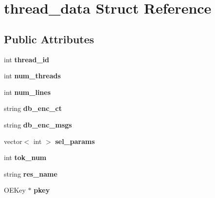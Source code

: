 \hypertarget{structthread__data}{\section{thread\-\_\-data Struct Reference}
\label{structthread__data}
}
\subsection*{Public Attributes}
\begin{DoxyCompactItemize}
\item 
\hypertarget{structthread__data_a7f99c8728f153827a108b77f60420074}{int {\bfseries thread\-\_\-id}}\label{structthread__data_a7f99c8728f153827a108b77f60420074}

\item 
\hypertarget{structthread__data_ac406249a3baf00e1ff1948e3384e4fd9}{int {\bfseries num\-\_\-threads}}\label{structthread__data_ac406249a3baf00e1ff1948e3384e4fd9}

\item 
\hypertarget{structthread__data_a37189156dac628a7eeb2d407e9e76eb4}{int {\bfseries num\-\_\-lines}}\label{structthread__data_a37189156dac628a7eeb2d407e9e76eb4}

\item 
\hypertarget{structthread__data_ac1995c6d9ca873a4678fda316dbce74b}{string {\bfseries db\-\_\-enc\-\_\-ct}}\label{structthread__data_ac1995c6d9ca873a4678fda316dbce74b}

\item 
\hypertarget{structthread__data_aeaf49d487ee0d162a590072089e7c413}{string {\bfseries db\-\_\-enc\-\_\-msgs}}\label{structthread__data_aeaf49d487ee0d162a590072089e7c413}

\item 
\hypertarget{structthread__data_a91e369008a51943546b2f4f3c72bacec}{vector$<$ int $>$ {\bfseries sel\-\_\-params}}\label{structthread__data_a91e369008a51943546b2f4f3c72bacec}

\item 
\hypertarget{structthread__data_a273ce0eb07aee8c86730da288284ff57}{int {\bfseries tok\-\_\-num}}\label{structthread__data_a273ce0eb07aee8c86730da288284ff57}

\item 
\hypertarget{structthread__data_a2210f39da12da0f53ad37d25a1b6ccb0}{string {\bfseries res\-\_\-name}}\label{structthread__data_a2210f39da12da0f53ad37d25a1b6ccb0}

\item 
\hypertarget{structthread__data_a57def2bfd78dc7c03a3096241a5fa387}{O\-E\-Key $\ast$ {\bfseries pkey}}\label{structthread__data_a57def2bfd78dc7c03a3096241a5fa387}


\end{DoxyCompactItemize}
